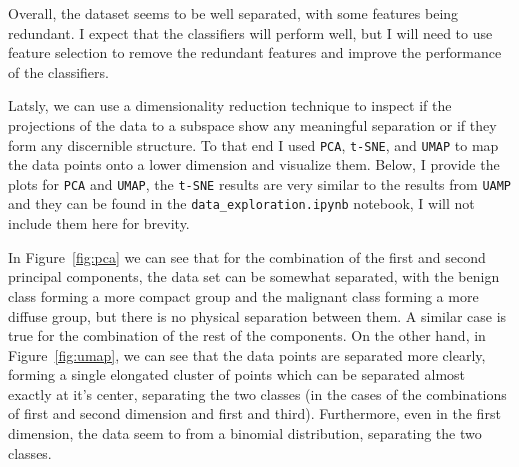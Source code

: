 \documentclass[12pt]{article}
\begin{document}
Overall, the dataset seems to be well separated, with some features being
redundant. I expect that the classifiers will perform well, but I will need to
use feature selection to remove the redundant features and improve the
performance of the classifiers.

Latsly, we can use a dimensionality reduction technique to inspect if the
projections of the data to a subspace show any meaningful separation or if they
form any discernible structure. To that end I used \texttt{PCA}, \texttt{t-SNE},
and \texttt{UMAP} to map the data points onto a lower dimension and visualize
them. Below, I provide the plots for \texttt{PCA} and \texttt{UMAP}, the
\texttt{t-SNE} results are very similar to the results from \texttt{UAMP} and
they can be found in the \texttt{data\_exploration.ipynb} notebook, I will not
include them here for brevity.

In Figure~\ref{fig:pca} we can see that for the combination of the first and
second principal components, the data set can be somewhat separated, with the
benign class forming a more compact group and the malignant class forming a more
diffuse group, but there is no physical separation between them. A similar
case is true for the combination of the rest of the components. On the other
hand, in Figure~\ref{fig:umap}, we can see that the data points are separated
more clearly, forming a single elongated cluster of points which can be
separated almost exactly at it's center, separating the two classes (in the
cases of the combinations of first and second dimension and first and third).
Furthermore, even in the first dimension, the data seem to from a binomial
distribution, separating the two classes.
\end{document}

